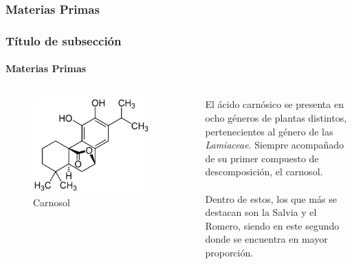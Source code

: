 \documentclass[aspectratio=1610]{beamer}
\newcommand{\ssec}{Título de subsección}
\begin{document}
\subsubsection{Materias Primas}
\begin{frame}
	\frametitle{\ssec}
	\framesubtitle{Materias Primas}
	\begin{columns}
		\begin{figure}[ht]
		\includegraphics[width=0.9\textwidth]{./figs/carnosol.png}
		\caption{Carnosol}
		\end{figure}
		El ácido carnósico se presenta en ocho géneros de plantas distintos, 
		pertenecientes al género de las \textit{Lamiaceae}.
		Siempre acompañado de su primer compuesto de descomposición, el carnosol. \\
		~\\
		Dentro de estos, los que más se destacan son la Salvia y el Romero,
		siendo en este segundo donde se encuentra en mayor proporción.
	\end{columns}
\end{frame}
\end{document}
